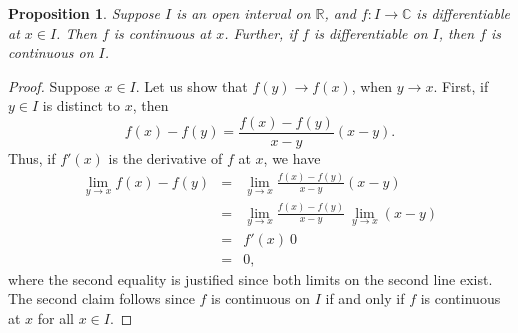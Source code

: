 \documentclass[12pt]{article}
\newcommand{\sC}[0]{\mathbb{C}}
\newtheorem{prop}{Proposition}
\begin{document}
\begin{prop}
Suppose $I$ is an open interval on $\mathbb{R}$,
and $f\colon I\to \sC$ is differentiable at $x\in I$. Then
$f$ is continuous at $x$. Further, if $f$ is differentiable on $I$,
then $f$ is continuous on $I$.
\end{prop}
                                                                                
\begin{proof}
Suppose $x\in I$. Let us show that
$f(y)\to f(x)$, when $y\to x$. First, if $y\in I$ is distinct to $x$,
then
$$
  f(x)-f(y) = \frac{f(x)-f(y)}{x-y} (x-y).
$$
Thus, if $f'(x)$ is the derivative of $f$ at $x$, we have
\begin{eqnarray*}
\lim_{y\to x} f(x)-f(y) &=& \lim_{y\to x} \frac{f(x)-f(y)}{x-y} (x-y) \\
   &=& \lim_{y\to x} \frac{f(x)-f(y)}{x-y}\  \lim_{y\to x}  (x-y) \\
   &=& f'(x)\  0 \\
   &=& 0,
\end{eqnarray*}
where the second equality is justified since both limits on the second line
exist. The second claim follows since $f$ is continuous on $I$ if and only
if $f$ is continuous at $x$ for all $x\in I$.  
\end{proof}
\end{document}
